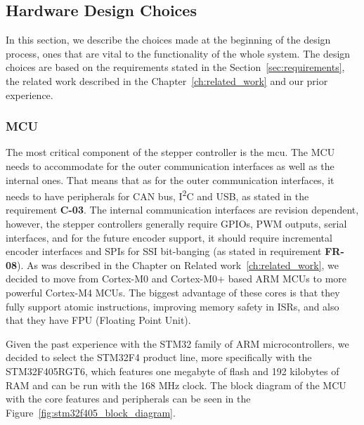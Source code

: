 \subsection{Hardware Design Choices}
\label{subsec:hardware_design_choices}
In this section, we describe the choices made at the beginning of the design process, ones that are vital to the functionality of the whole system.
The design choices are based on the requirements stated in the Section~\ref{sec:requirements}, the related work described in the Chapter~\ref{ch:related_work} and our prior experience.

\subsubsection{MCU}
\label{subsubsec:mcu}
The most critical component of the stepper controller is the \acs{mcu}.
The MCU needs to accommodate for the outer communication interfaces as well as the internal ones.
That means that as for the outer communication interfaces, it needs to have peripherals for CAN bus, I\textsuperscript{2}C and USB, as stated in the requirement \textbf{C-03}.
The internal communication interfaces are revision dependent, however, the stepper controllers generally require GPIOs, PWM outputs, serial interfaces, and for the future encoder support, it should require incremental encoder interfaces and SPIs for SSI bit-banging (as stated in requirement \textbf{FR-08}).
As was described in the Chapter on Related work~\ref{ch:related_work}, we decided to move from Cortex-M0 and Cortex-M0+ based ARM MCUs to more powerful Cortex-M4 MCUs.
The biggest advantage of these cores is that they fully support atomic instructions, improving memory safety in ISRs, and also that they have FPU (Floating Point Unit).

Given the past experience with the STM32 family of ARM microcontrollers, we decided to select the STM32F4 product line, more specifically with the STM32F405RGT6, which features one megabyte of flash and 192 kilobytes of RAM and can be run with the 168 MHz clock\cite{stmicro_stm32f405rg_nodate}.
The block diagram of the MCU with the core features and peripherals can be seen in the Figure~\ref{fig:stm32f405_block_diagram}.

